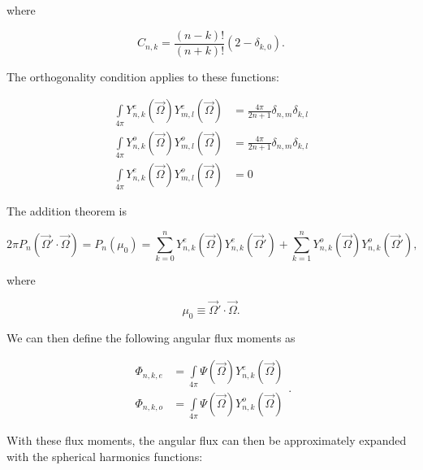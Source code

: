 \noindent where

\begin{equation}
\label{eq::App_SN_sharm_consts}
C_{n,k} = \frac{(n-k)!}{ (n+k) !}( 2-  \delta_{k,0}).
\end{equation}

\noindent The orthogonality condition applies to these functions:

\begin{equation}
\label{eq::App_SN_sharm_orth}
\begin{aligned}
\int\limits_{4 \pi} Y^e_{n,k} (\vec{\Omega}) Y^e_{m,l} (\vec{\Omega}) &= \frac{4 \pi}{2n+1} \delta_{n,m} \delta_{k,l} \\ 
\int\limits_{4 \pi} Y^o_{n,k} (\vec{\Omega}) Y^o_{m,l} (\vec{\Omega}) &= \frac{4 \pi}{2n+1} \delta_{n,m} \delta_{k,l} \\ 
\int\limits_{4 \pi} Y^e_{n,k} (\vec{\Omega}) Y^o_{m,l} (\vec{\Omega}) &= 0
\end{aligned} 
\end{equation}

\noindent The addition theorem is

\begin{equation}
\label{eq::App_SN_sharm_addition}
2 \pi P_n (\vec{\Omega}' \cdot \vec{\Omega}) = P_n (\mu_0) = \sum_{k=0}^{n} Y^e_{n,k} (\vec{\Omega}) Y^e_{n,k} (\vec{\Omega}') + \sum_{k=1}^{n} Y^o_{n,k} (\vec{\Omega}) Y^o_{n,k} (\vec{\Omega}') ,
\end{equation}

\noindent where

\begin{equation}
\label{eq::App_SN_mu_to_omegas}
\mu_0 \equiv \vec{\Omega}' \cdot \vec{\Omega} .
\end{equation}

\noindent We can then define the following angular flux moments as

\begin{equation}
\label{eq::App_SN_sharm_fluxmom}
\begin{aligned}
\Phi_{n,k,e} &=\int\limits_{4 \pi}\Psi (\vec{\Omega})  Y^e_{n,k} (\vec{\Omega})   \\ 
\Phi_{n,k,o} &=\int\limits_{4 \pi}\Psi (\vec{\Omega}) Y^o_{n,k} (\vec{\Omega}) 
\end{aligned} .
\end{equation}

\noindent With these flux moments, the angular flux can then be approximately expanded with the spherical harmonics functions:

